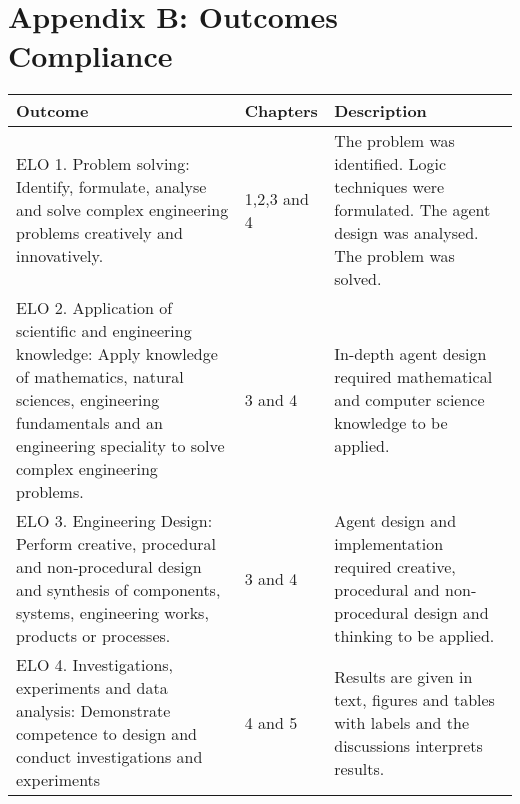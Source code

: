 \setcounter{table}{0}
\renewcommand{\thetable}{B.\arabic{table}}

\vspace{-5cm}



\chapter{Appendix B: Outcomes Compliance}


    
 \begin{table}[H]
  \begin{center}
    \begin{tabular}{ | p{8cm} | l | p{6cm} |}
    \hline
    
    Outcome & Chapters & Description \\ \hline \hline
    
    ELO 1. Problem solving: Identify, formulate, analyse and solve complex	engineering problems creatively and innovatively. & 1,2,3 and 4 & The problem was identified. Logic techniques were formulated. The agent design was analysed. The problem was solved. \\ \hline
    
    
    ELO 2. Application of scientific and engineering knowledge: Apply knowledge of mathematics, natural sciences,
engineering fundamentals and an engineering speciality to solve complex engineering problems. & 3 and 4 & In-depth agent design required mathematical and computer science knowledge to be applied. \\ \hline
    
    
    ELO 3. Engineering Design: Perform creative, procedural and non‐procedural design and synthesis of components, systems, engineering works, products or processes. & 3 and 4 & Agent design and implementation required creative, procedural and non‐procedural design and thinking to be applied. \\ \hline



    ELO 4. Investigations, experiments and data analysis: Demonstrate competence to design and conduct investigations and experiments & 4 and 5 & Results are given in text, figures and tables with labels and the discussions interprets results.  \\  \hline



\end{tabular}
\end{center}
\end{table}
